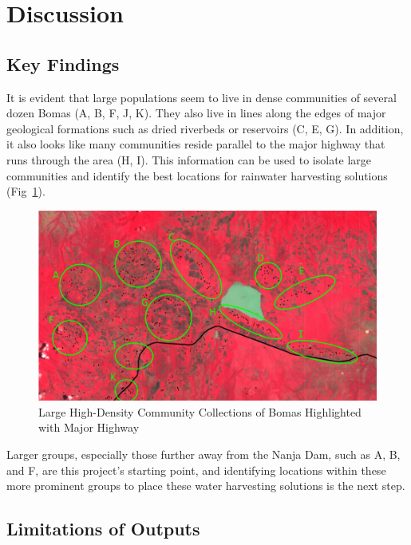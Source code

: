 \documentclass[10pt]{article}
\begin{document}

\section{Discussion}

\subsection{Key Findings}

It is evident that large populations seem to live in dense communities of several dozen Bomas (A, B, F, J, K). They also live in lines along the edges of major geological formations such as dried riverbeds or reservoirs (C, E, G). In addition, it also looks like many communities reside parallel to the major highway that runs through the area (H, I). This information can be used to isolate large communities and identify the best locations for rainwater harvesting solutions (Fig~\ref{fig:Communities and Major Highway}).

\begin{figure} [H]
    \centering
    \includegraphics[width=1\linewidth]{images/Communities and Highway Highlighted.png}
    \caption{Large High-Density Community Collections of Bomas Highlighted with Major Highway}
    \label{fig:Communities and Major Highway}
\end{figure}

Larger groups, especially those further away from the Nanja Dam, such as A, B, and F, are this project's starting point, and identifying locations within these more prominent groups to place these water harvesting solutions is the next step. 

\subsection{Limitations of Outputs}
\end{document}
